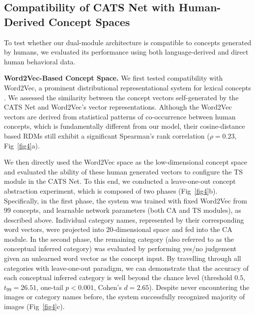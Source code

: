 \documentclass[pdflatex,sn-mathphys-num,lineno]{sn-jnl}%
\begin{document}
\begin{CJK}{UTF8}{gbsn}
\subsection{Compatibility of CATS Net with Human-Derived Concept Spaces} 

To test whether our dual-module architecture is compatible to concepts generated by humans, we evaluated its performance using both language-derived and direct human behavioral data.

\textbf{Word2Vec-Based Concept Space.} We first tested compatibility with Word2Vec, a prominent distributional representational system for lexical concepts \cite{mikolov_distributed_2013,mikolov_advances_2018}. We assessed the similarity between the concept vectors self-generated by the CATS Net and Word2Vec's vector representations. Although the Word2Vec vectors are derived from statistical patterns of co-occurrence between human concepts, which is fundamentally different from our model, their cosine-distance based RDMs still exhibit a significant Spearman's rank correlation ($\rho=0.23$, Fig~\ref{fig4}a). 

We then directly used the Word2Vec space as the low-dimensional concept space and evaluated the ability of these human generated vectors to configure the TS module in the CATS Net. To this end, we conducted a leave-one-out concept abstraction experiment, which is composed of two phases (Fig~\ref{fig4}b). Specifically, in the first phase, the system was trained with fixed Word2Vec from 99 concepts, and learnable network parameters (both CA and TS modules), as described above. Individual category names, represented by their corresponding word vectors, were projected into 20-dimensional space and fed into the CA module. In the second phase, the remaining category (also referred to as the conceptual inferred category) was evaluated by performing yes/no judgement given an unlearned word vector as the concept input. By travelling through all categories with leave-one-out paradigm, we can demonstrate that the accuracy of each conceptual inferred category is well beyond the chance level (threshold $0.5$, $t_{99}=26.51$, one-tail $p < 0.001$, Cohen's $d = 2.65$). Despite never encountering the images or category names before, the system successfully recognized majority of images (Fig~\ref{fig4}c).


\end{CJK}
\end{document}

